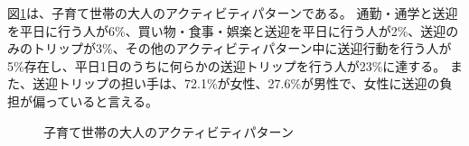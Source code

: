 \documentclass[a4paper,12pt, uplatex]{jsbook}
\begin{document}
図\ref{fig:activity_pattern_parent}は、子育て世帯の大人のアクティビティパターンである。
通勤・通学と送迎を平日に行う人が6\%、買い物・食事・娯楽と送迎を平日に行う人が2\%、送迎のみのトリップが3\%、その他のアクティビティパターン中に送迎行動を行う人が5\%存在し、平日1日のうちに何らかの送迎トリップを行う人が23\%に達する。
また、送迎トリップの担い手は、72.1\%が女性、27.6\%が男性で、女性に送迎の負担が偏っていると言える。
%
\begin{figure}[htbp]
  \centering
    \caption{子育て世帯の大人のアクティビティパターン}
  	\label{fig:activity_pattern_parent}
\end{figure}
\end{document}
